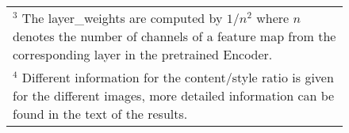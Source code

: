 \begin{figure}[H]
\begin{center}
\begin{rotate}{90}
\begin{tabular}{c|c|c}
		\multicolumn{3}{l}{\scriptsize{$^3$ The layer\_weights are computed by $1/n^2$ where $n$ denotes the number of channels of a feature map from the corresponding layer in the pretrained Encoder.}}\\
		\multicolumn{3}{l}{\scriptsize{$^4$ Different information for the content/style ratio is given for the different images, more detailed information can be found in the text of the results.}}
	\end{tabular}
\end{rotate}
\label{tab:GEB2016_parameters}
\end{center}
\end{figure}

